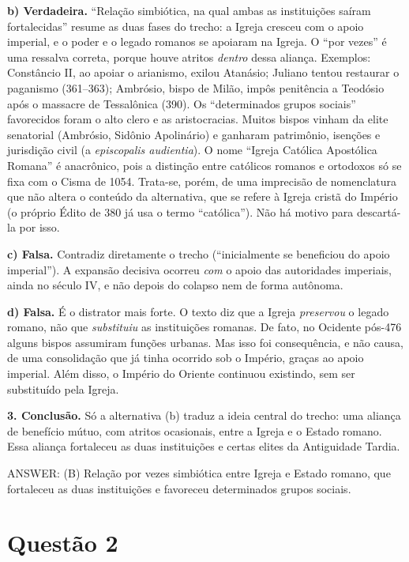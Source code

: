 \documentclass{article}%
\begin{document}
\textbf{b) Verdadeira.} ``Relação simbiótica, na qual ambas as instituições saíram fortalecidas'' resume as duas fases do trecho: a Igreja cresceu com o apoio imperial, e o poder e o legado romanos se apoiaram na Igreja. O ``por vezes'' é uma ressalva correta, porque houve atritos \emph{dentro} dessa aliança. Exemplos: Constâncio II, ao apoiar o arianismo, exilou Atanásio; Juliano tentou restaurar o paganismo (361--363); Ambrósio, bispo de Milão, impôs penitência a Teodósio após o massacre de Tessalônica (390). Os ``determinados grupos sociais'' favorecidos foram o alto clero e as aristocracias. Muitos bispos vinham da elite senatorial (Ambrósio, Sidônio Apolinário) e ganharam patrimônio, isenções e jurisdição civil (a \emph{episcopalis audientia}). O nome ``Igreja Católica Apostólica Romana'' é anacrônico, pois a distinção entre católicos romanos e ortodoxos só se fixa com o Cisma de 1054. Trata-se, porém, de uma imprecisão de nomenclatura que não altera o conteúdo da alternativa, que se refere à Igreja cristã do Império (o próprio Édito de 380 já usa o termo ``católica''). Não há motivo para descartá-la por isso.

\textbf{c) Falsa.} Contradiz diretamente o trecho (``inicialmente se beneficiou do apoio imperial''). A expansão decisiva ocorreu \emph{com} o apoio das autoridades imperiais, ainda no século IV, e não depois do colapso nem de forma autônoma.

\textbf{d) Falsa.} É o distrator mais forte. O texto diz que a Igreja \emph{preservou} o legado romano, não que \emph{substituiu} as instituições romanas. De fato, no Ocidente pós-476 alguns bispos assumiram funções urbanas. Mas isso foi consequência, e não causa, de uma consolidação que já tinha ocorrido sob o Império, graças ao apoio imperial. Além disso, o Império do Oriente continuou existindo, sem ser substituído pela Igreja.

\textbf{3. Conclusão.} Só a alternativa (b) traduz a ideia central do trecho: uma aliança de benefício mútuo, com atritos ocasionais, entre a Igreja e o Estado romano. Essa aliança fortaleceu as duas instituições e certas elites da Antiguidade Tardia.

\medskip
ANSWER: (B) Relação por vezes simbiótica entre Igreja e Estado romano, que fortaleceu as duas instituições e favoreceu determinados grupos sociais.%
\newpage%
\section*{Questão 2}
\end{document}
